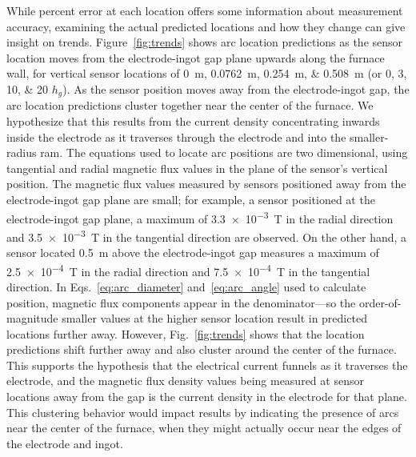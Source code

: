 \documentclass[onehalf,11pt]{beavtex}
\begin{document}
While percent error at each location offers some information about measurement accuracy, examining the actual predicted locations and how they change can give insight on trends. 
Figure~\ref{fig:trends} shows arc location predictions as the sensor location moves from the electrode-ingot gap plane upwards along the furnace wall, for vertical sensor locations of \SIlist{0;0.0762;0.254;0.508}{\meter} (or \numlist{0;3;10;20} $h_g$).
As the sensor position moves away from the electrode-ingot gap, the arc location predictions cluster together near the center of the furnace. 
We hypothesize that this results from the current density concentrating inwards inside the electrode as it traverses through the electrode and into the smaller-radius ram.
The equations used to locate arc positions are two dimensional, using tangential and radial magnetic flux values in the plane of the sensor's vertical position.
The magnetic flux values measured by sensors positioned away from the electrode-ingot gap plane are small; for example, a sensor positioned at the electrode-ingot gap plane, a maximum of \SI{3.3e-3}{\tesla} in the radial direction and \SI{3.5e-3}{\tesla} in the tangential direction are observed.
On the other hand, a sensor located \SI{0.5}{\meter} above the electrode-ingot gap measures a maximum of \SI{2.5e-4}{\tesla} in the radial direction and \SI{7.5e-4}{\tesla} in the tangential direction.
In Eqs.~\ref{eq:arc_diameter} and~\ref{eq:arc_angle} used to calculate position, magnetic flux components appear in the denominator---so the order-of-magnitude smaller values at the higher sensor location result in predicted locations further away.
However, Fig.~\ref{fig:trends} shows that the location predictions shift further away and also cluster around the center of the furnace.
This supports the hypothesis that the electrical current funnels as it traverses the electrode, and the magnetic flux density values being measured at sensor locations away from the gap is the current density in the electrode for that plane.
This clustering behavior would impact results by indicating the presence of arcs near the center of the furnace, when they might actually occur near the edges of the electrode and ingot.
\end{document}
